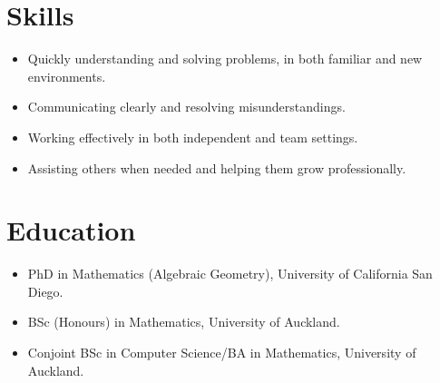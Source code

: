 \documentclass[10pt]{article}
\newcommand\asideformat{\bfseries\color{black!62.5}}
\newcommand\aside[1]{\hfill{\footnotesize\asideformat\raisebox{1pt}{#1}}}
\begin{document}
\section{Skills}

\begin{itemize}
\item
	Quickly understanding and solving problems, in both familiar and new environments.
\item
	Communicating clearly and resolving misunderstandings.
\item
	Working effectively in both independent and team settings.
\item
	Assisting others when needed and helping them grow professionally.
\end{itemize}

\section{Education}

\begin{itemize}
\item
	PhD in Mathematics (Algebraic Geometry), University of California San Diego. \aside{2013--2019}
\item
	BSc (Honours) in Mathematics, University of Auckland. \aside{2012\phantom{--2012}}
\item
	Conjoint BSc in Computer Science/BA in Mathematics, University of Auckland. \aside{2009--2011}
\end{itemize}
\end{document}
